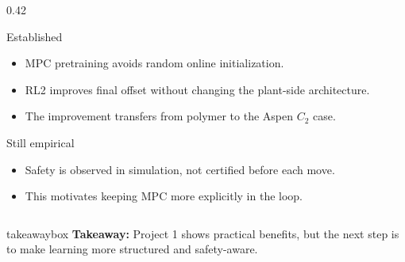 \documentclass[aspectratio=169]{beamer}
\begin{document}
\begin{frame}
\begin{columns}[T,onlytextwidth]
\begin{column}{0.42\textwidth}

\begin{block}{Established}
\begin{itemize}\justifying
  \setlength{\itemsep}{0.12em}
  \item MPC pretraining avoids random online initialization.
  \item RL2 improves final offset without changing the plant-side architecture.
  \item The improvement transfers from polymer to the Aspen \(C_2\) case.
\end{itemize}
\end{block}

\vspace{0.02cm}

\begin{block}{Still empirical}
\begin{itemize}\justifying
  \setlength{\itemsep}{0.12em}
  \item Safety is observed in simulation, not certified before each move.
  \item This motivates keeping MPC more explicitly in the loop.
\end{itemize}
\end{block}

\end{column}

\end{columns}

{\centering
\begin{beamercolorbox}[wd=0.94\textwidth,sep=1.5pt,center,rounded=true]{takeawaybox}
\textbf{\textcolor{maroon1}{Takeaway:}} Project 1 shows practical benefits, but the next step is to make learning more structured and safety-aware.
\end{beamercolorbox}
\par}

\end{frame}
\end{document}
